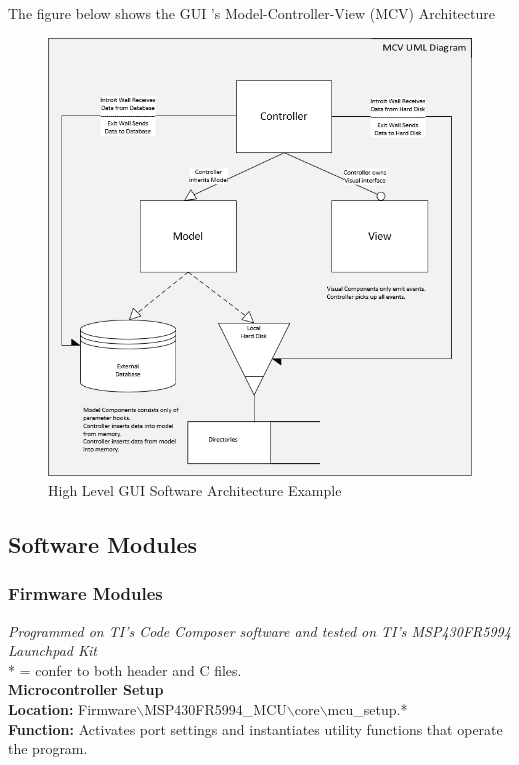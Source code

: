 \documentclass[12pt]{article}
\begin{document}
\indent
The figure below shows the GUI 's Model-Controller-View (MCV) Architecture
\hfill

\begin{figure}[h!]
\centering
\includegraphics[width=0.88\linewidth]{mcv_arch}
\caption{High Level GUI Software Architecture Example}
\end{figure}

\hfill
\pagebreak

\subsection{Software Modules}

\subsubsection{Firmware Modules} \textit{Programmed on TI's Code Composer software and tested on TI's MSP430FR5994 Launchpad Kit}\\

\indent
* = confer to both header and C files.\\

\noindent
\textbf{
Microcontroller Setup \\
Location: 
}
\space Firmware$\backslash$MSP430FR5994\_MCU$\backslash$core$\backslash$mcu\_setup.*\\
\textbf{
Function: }
Activates port settings and instantiates utility functions that operate the program.\\
\end{document}
